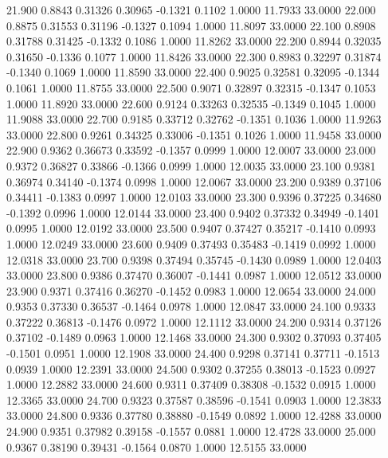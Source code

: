   21.900   0.8843   0.31326   0.30965  -0.1321   0.1102   1.0000  11.7933  33.0000
  22.000   0.8875   0.31553   0.31196  -0.1327   0.1094   1.0000  11.8097  33.0000
  22.100   0.8908   0.31788   0.31425  -0.1332   0.1086   1.0000  11.8262  33.0000
  22.200   0.8944   0.32035   0.31650  -0.1336   0.1077   1.0000  11.8426  33.0000
  22.300   0.8983   0.32297   0.31874  -0.1340   0.1069   1.0000  11.8590  33.0000
  22.400   0.9025   0.32581   0.32095  -0.1344   0.1061   1.0000  11.8755  33.0000
  22.500   0.9071   0.32897   0.32315  -0.1347   0.1053   1.0000  11.8920  33.0000
  22.600   0.9124   0.33263   0.32535  -0.1349   0.1045   1.0000  11.9088  33.0000
  22.700   0.9185   0.33712   0.32762  -0.1351   0.1036   1.0000  11.9263  33.0000
  22.800   0.9261   0.34325   0.33006  -0.1351   0.1026   1.0000  11.9458  33.0000
  22.900   0.9362   0.36673   0.33592  -0.1357   0.0999   1.0000  12.0007  33.0000
  23.000   0.9372   0.36827   0.33866  -0.1366   0.0999   1.0000  12.0035  33.0000
  23.100   0.9381   0.36974   0.34140  -0.1374   0.0998   1.0000  12.0067  33.0000
  23.200   0.9389   0.37106   0.34411  -0.1383   0.0997   1.0000  12.0103  33.0000
  23.300   0.9396   0.37225   0.34680  -0.1392   0.0996   1.0000  12.0144  33.0000
  23.400   0.9402   0.37332   0.34949  -0.1401   0.0995   1.0000  12.0192  33.0000
  23.500   0.9407   0.37427   0.35217  -0.1410   0.0993   1.0000  12.0249  33.0000
  23.600   0.9409   0.37493   0.35483  -0.1419   0.0992   1.0000  12.0318  33.0000
  23.700   0.9398   0.37494   0.35745  -0.1430   0.0989   1.0000  12.0403  33.0000
  23.800   0.9386   0.37470   0.36007  -0.1441   0.0987   1.0000  12.0512  33.0000
  23.900   0.9371   0.37416   0.36270  -0.1452   0.0983   1.0000  12.0654  33.0000
  24.000   0.9353   0.37330   0.36537  -0.1464   0.0978   1.0000  12.0847  33.0000
  24.100   0.9333   0.37222   0.36813  -0.1476   0.0972   1.0000  12.1112  33.0000
  24.200   0.9314   0.37126   0.37102  -0.1489   0.0963   1.0000  12.1468  33.0000
  24.300   0.9302   0.37093   0.37405  -0.1501   0.0951   1.0000  12.1908  33.0000
  24.400   0.9298   0.37141   0.37711  -0.1513   0.0939   1.0000  12.2391  33.0000
  24.500   0.9302   0.37255   0.38013  -0.1523   0.0927   1.0000  12.2882  33.0000
  24.600   0.9311   0.37409   0.38308  -0.1532   0.0915   1.0000  12.3365  33.0000
  24.700   0.9323   0.37587   0.38596  -0.1541   0.0903   1.0000  12.3833  33.0000
  24.800   0.9336   0.37780   0.38880  -0.1549   0.0892   1.0000  12.4288  33.0000
  24.900   0.9351   0.37982   0.39158  -0.1557   0.0881   1.0000  12.4728  33.0000
  25.000   0.9367   0.38190   0.39431  -0.1564   0.0870   1.0000  12.5155  33.0000
